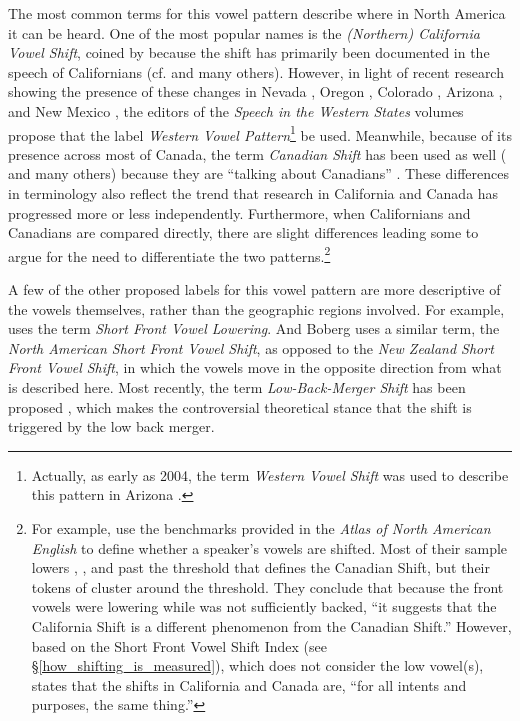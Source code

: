 The most common terms for this vowel pattern describe where in North America it can be heard. One of the most popular names is the \textit{(Northern) California Vowel Shift}, coined by \citet{eckert_2008} because the shift has primarily been documented in the speech of Californians (cf. \citealt{hall_lew_etal_2015, janoff_2018, podesva_2011, podesva_etal_2015, villarreal_2016_pads, villarreal_2018} and many others). However, in light of recent research showing the presence of these changes in Nevada \citep{fridland_kendall_2017_pads}, Oregon \citep{conn_2000_diss, nelson_2011, becker_etal_2016_pads, mclarty_etal_2016}, Colorado \citep{holland_brandenburg_2017_pads, holland_2019}, Arizona \citep{hall_lew_etal_2017}, and New Mexico \citep{brumbaugh_koops_2017_pads}, the editors of the \textit{Speech in the Western States} volumes \citep{fridland_etal_2016_pads, fridland_etal_2017_pads} propose that the label \textit{Western Vowel Pattern}\footnote{Actually, as early as 2004, the term \textit{Western Vowel Shift} was used to describe this pattern in Arizona \citep{hall_lew_2004}.} be used. Meanwhile, because of its presence across most of Canada, the term \textit{Canadian Shift} has been used as well  (\citealt{clarke_etal_1995, boberg_2005, sadlier_brown_tamminga_2008, roeder_jarmasz_2010, kettig_2014} and many others) because they are ``talking about Canadians'' \citep{li_etal_2018}. These differences in terminology also reflect the trend that research in California and Canada has progressed more or less independently. Furthermore, when Californians and Canadians are compared directly, there are slight differences \citep{kennedy_grama_2012, hagiwara_2006} leading some to argue for the need to differentiate the two patterns.\footnote{For example, \citet[49]{kennedy_grama_2012} use the benchmarks provided in the \textit{Atlas of North American English} to define whether a speaker’s vowels are shifted. Most of their sample lowers \kit, \dress, and \trap past the threshold that defines the Canadian Shift, but their tokens of \lot cluster around the threshold. They conclude that because the front vowels were lowering while \lot was not sufficiently backed, ``it suggests that the California Shift is a different phenomenon from the Canadian Shift.'' However, based on the Short Front Vowel Shift Index (see \S\ref{how_shifting_is_measured}), which does not consider the low vowel(s), \citet[21]{boberg_2019} states that the shifts in California and Canada are, ``for all intents and purposes, the same thing.''}

A few of the other proposed labels for this vowel pattern are more descriptive of the vowels themselves, rather than the geographic regions involved. For example, \citet{hickey_2018} uses the term \textit{Short Front Vowel Lowering}. And Boberg \citeyearpar{boberg_2019} uses a similar term, the \textit{North American Short Front Vowel Shift}, as opposed to the \textit{New Zealand Short Front Vowel Shift}, in which the vowels move in the opposite direction from what is described here. Most recently, the term \textit{Low-Back-Merger Shift} has been proposed \citep{becker_2019_pads}, which makes the controversial theoretical stance that the shift is triggered by the low back merger.

